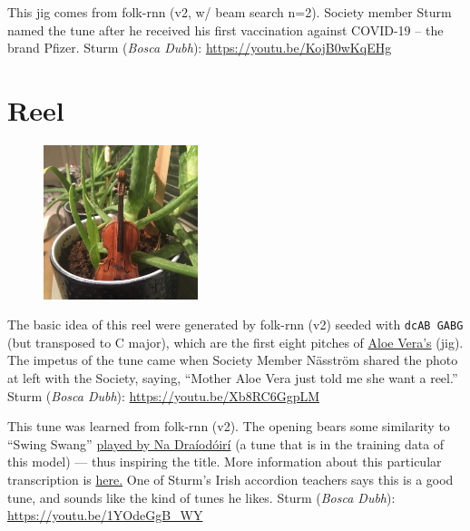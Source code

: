 \documentclass[a4paper,notitlepage,twoside]{book}
\begin{document}
{}  
\hypertarget{jig:PfirstDoseofPfizer}{}
This jig comes from folk-rnn (v2, w/ beam search n=2). 
Society member Sturm named the tune after he received
his first vaccination against COVID-19 -- the brand Pfizer.
Sturm ({\em Bosca Dubh}): \url{https://youtu.be/KojB0wKqEHg}

\clearpage
\section{Reel}
{}  
\hypertarget{reel:AloeVeras}{}
\begin{figure}
\vspace{-0.3in}
\includegraphics[width=0.4\textwidth]{AloeVera2.jpg}
\end{figure}
The basic idea of this reel were generated by folk-rnn (v2) 
seeded with {\tt dcAB GABG} (but transposed to C major), 
which are the first eight pitches of \hyperlink{jig:AloeVeras}{Aloe Vera's} (jig).
The impetus of the tune came when Society Member Näsström shared the photo at left with the Society,
saying, ``Mother Aloe Vera just told me she want a reel.''
Sturm ({\em Bosca Dubh}): \url{https://youtu.be/Xb8RC6GgpLM}

\clearpage
{}
{}  
\hypertarget{reel:SwingSwangSwung}{}
This tune was learned from folk-rnn (v2).
The opening bears some similarity to ``Swing Swang'' 
\href{https://youtu.be/Fl3e4010epE?t=50}{played by Na Dra\'iod\'oir\'i}
(a tune that is in the training data of this model) ---
thus inspiring the title.
More information about this particular transcription is \href{https://highnoongmt.wordpress.com/2018/01/03/making-sense-of-the-folk-rnn-v2-model-part-5/}{here.}
One of Sturm's Irish accordion teachers says this is a good tune, and sounds like the kind of tunes he likes.
Sturm ({\em Bosca Dubh}): \url{https://youtu.be/1YOdeGgB_WY}
\end{document}
